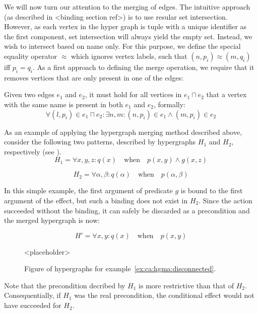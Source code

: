 \documentclass[../Master.tex]{subfiles}
\begin{document}
We will now turn our attention to the merging of edges. The intuitive approach (as described in <binding section ref>) is to use resular set intersection. However, as each vertex in the hyper graph is tuple with a unique identifier as the first component, set intersection will always yield the empty set. Instead, we wish to intersect based on name only. For this purpose, we define the special equality operator $\approx$ which ignores vertex labels, such that $\left(n,p_i\right) \approx \left(m, q_i\right)$ iff $p_i = q_i$. As a first approach to defining the merge operation, we require that it removes vertices that are only present in one of the edges:

\begin{proposition}
	Given two edges $e_1$ and $e_2$, it must hold for all vertices in $e_1 \sqcap e_2$ that a vertex with the same name is present in both $e_1$ and $e_2$, formally:
	\begin{equation*}
		\forall \left(l, p_i\right) \in e_1 \sqcap e_2 : 
		\exists n,m : \left(n, p_i\right) \in e_1 \land \left(m, p_i\right) \in e_2
	\end{equation*}
\end{proposition}

\begin{example} \label{ex:ca:hgma:disconnected}
	As an example of applying the hypergraph merging method described above, consider the following two patterns, described by hypergraphs $H_1$ and $H_2$, respectively (see ).
    \begin{equation*}
        H_1 = \forall x, y, z : q(x) \quad \text{when} \quad
            p(x,y) \land g(x, z)
    \end{equation*}

    \begin{equation*}
        H_2 = \forall \alpha, \beta : q(\alpha) \quad \text{when} \quad
            p(\alpha, \beta)
    \end{equation*}

	In this simple example, the first argument of predicate $g$ is bound to the first argument of the effect, but such a binding does not exist in $H_2$. Since the action succeeded without the binding, it can safely be discarded as a precondition and the merged hypergraph is now:

    \begin{equation*}
        H' = \forall x, y : q(x) \quad \text{when} \quad p(x, y)
    \end{equation*}

    \begin{figure}
        <placeholder>
        \caption{\label{fig:ex:ca:hgma:ex:disconnected} Figure of hypergraphs for example~\ref{ex:ca:hgma:disconnected}.}
    \end{figure}

    Note that the precondition decribed by $H_1$ is more restrictive than that of $H_2$. Consequentially, if $H_1$ was the real precondition, the conditional effect would not have succeeded for $H_2$.
\end{example}
\end{document}
